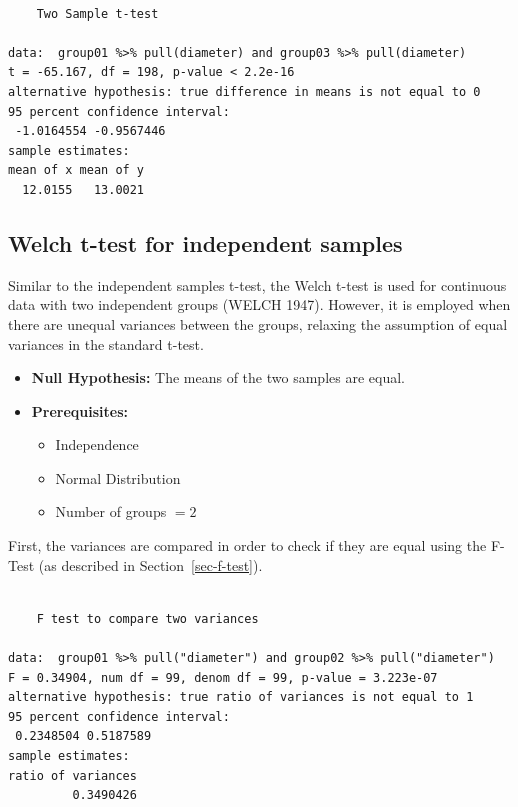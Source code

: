 \documentclass[
  a4paper,
]{scrbook}
\providecommand{\tightlist}{%
  \setlength{\itemsep}{0pt}\setlength{\parskip}{0pt}}\usepackage{longtable,booktabs,array}
\begin{document}
\begin{verbatim}

    Two Sample t-test

data:  group01 %>% pull(diameter) and group03 %>% pull(diameter)
t = -65.167, df = 198, p-value < 2.2e-16
alternative hypothesis: true difference in means is not equal to 0
95 percent confidence interval:
 -1.0164554 -0.9567446
sample estimates:
mean of x mean of y 
  12.0155   13.0021 
\end{verbatim}

\subsection{Welch t-test for independent
samples}\label{welch-t-test-for-independent-samples}

Similar to the independent samples t-test, the Welch t-test is used for
continuous data with two independent groups (WELCH 1947). However, it is
employed when there are unequal variances between the groups, relaxing
the assumption of equal variances in the standard t-test.

\begin{itemize}
\tightlist
\item
  \textbf{Null Hypothesis:} The means of the two samples are equal.
\item
  \textbf{Prerequisites:}

  \begin{itemize}
  \tightlist
  \item
    Independence
  \item
    Normal Distribution
  \item
    Number of groups \(=2\)
  \end{itemize}
\end{itemize}

First, the variances are compared in order to check if they are equal
using the F-Test (as described in Section~\ref{sec-f-test}).

\begin{verbatim}

    F test to compare two variances

data:  group01 %>% pull("diameter") and group02 %>% pull("diameter")
F = 0.34904, num df = 99, denom df = 99, p-value = 3.223e-07
alternative hypothesis: true ratio of variances is not equal to 1
95 percent confidence interval:
 0.2348504 0.5187589
sample estimates:
ratio of variances 
         0.3490426 
\end{verbatim}
\end{document}
